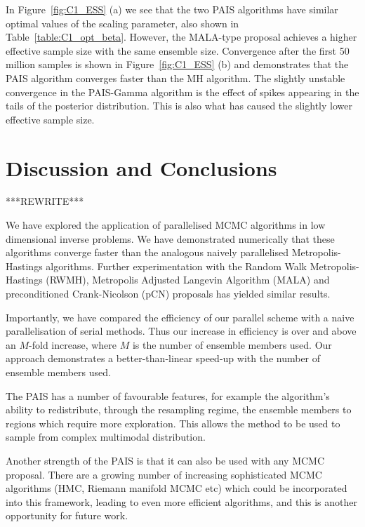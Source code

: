 \documentclass[final]{siamltex}
\begin{document}
In Figure~\ref{fig:C1_ESS} (a) we see that the two PAIS algorithms have similar optimal values of the scaling parameter, also shown in Table~\ref{table:C1_opt_beta}. However, the MALA-type proposal achieves a higher effective sample size with the same ensemble size. Convergence after the first 50 million samples is shown in Figure~\ref{fig:C1_ESS} (b) and demonstrates that the PAIS algorithm converges faster than the MH algorithm. The slightly unstable convergence in the PAIS-Gamma algorithm is the effect of spikes appearing in the tails of the posterior distribution. This is also what has caused the slightly lower effective sample size.

\section{Discussion and Conclusions}\label{Sec:Conc} 

***REWRITE***

We have explored the application of parallelised MCMC algorithms in
low dimensional inverse problems. We have demonstrated numerically
that these algorithms converge faster than the analogous naively parallelised
Metropolis-Hastings algorithms. Further experimentation with the
Random Walk Metropolis-Hastings (RWMH), Metropolis Adjusted Langevin
Algorithm (MALA) and preconditioned Crank-Nicolson (pCN) proposals has
yielded similar results\cite{Paul}.

Importantly, we have compared the efficiency of our parallel scheme
with a naive parallelisation of serial methods. Thus our increase in
efficiency is over and above an $M$-fold increase, where $M$ is the
number of ensemble members used. Our approach
demonstrates a better-than-linear speed-up with the number of ensemble
members used. 

The PAIS has a number of favourable features, for example the
algorithm's ability to redistribute, through the resampling regime,
the ensemble members to regions which require more exploration. This allows the
method to be used to sample from complex multimodal distribution.

Another strength of the PAIS is that it can also be used with any MCMC
proposal. There are a growing number of increasing sophisticated MCMC
algorithms (HMC, Riemann manifold MCMC etc) which could be
incorporated into this framework, leading to even more efficient
algorithms, and this is another opportunity for future work. 

\end{document}
